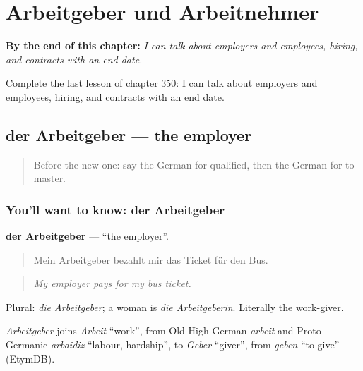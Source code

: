 
\chapter{Arbeitgeber und Arbeitnehmer}
\label{ch:ge-arbeitgeber-und-arbeitnehmer}

\begin{chapteropening}
\textbf{By the end of this chapter:} \emph{I can talk about employers and employees, hiring, and contracts with an end date.}

Complete the last lesson of chapter 350: I can talk about employers and employees, hiring, and contracts with an end date.
\end{chapteropening}

\section[der Arbeitgeber]{der Arbeitgeber — the employer}

\label{lesson:GE-C350-arbeitgeber}



\begin{quote}
Before the new one: say the German for qualified, then the German for to master.
\end{quote}

\subsection*{You'll want to know: der Arbeitgeber}
\textbf{der Arbeitgeber} — \textquotedblleft{}the employer\textquotedblright{}.

\begin{quote}
Mein Arbeitgeber bezahlt mir das Ticket für den Bus.
\end{quote}

\begin{quote}
\emph{My employer pays for my bus ticket.}
\end{quote}

Plural: \emph{die Arbeitgeber}; a woman is \emph{die Arbeitgeberin}. Literally the work-giver.

\begin{cousinweb}
\emph{Arbeitgeber} joins \emph{Arbeit} \textquotedblleft{}work\textquotedblright{}, from Old High German \emph{arbeit} and Proto-Germanic \emph{arbaidiz} \textquotedblleft{}labour, hardship\textquotedblright{}, to \emph{Geber} \textquotedblleft{}giver\textquotedblright{}, from \emph{geben} \textquotedblleft{}to give\textquotedblright{} (EtymDB).
\end{cousinweb}

